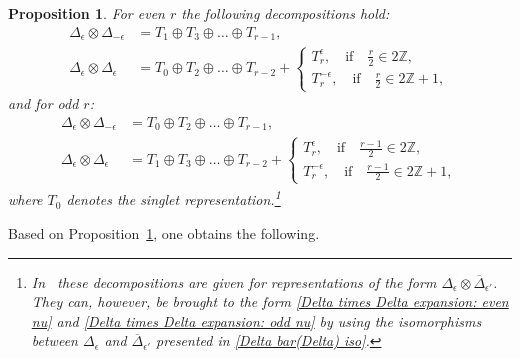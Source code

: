 \documentclass[a4paper]{article}
\newcommand{\oDelta}{\overline{\Delta}}
\renewcommand{\=}{\ =\ }
\numberwithin{equation}{section}
\newtheorem{proposition}{Proposition}
\theoremstyle{remark}
\begin{document}
\begin{proposition}\label{Proposition 6.4.1 from IsRu2}
For even $r$ the following decompositions hold:
\begin{equation}\label{Delta times Delta expansion: even nu}
\begin{aligned}
\Delta_\epsilon\otimes \Delta_{-\epsilon}&=T_1\oplus T_3\oplus\dots\oplus T_{r-1},\\
\Delta_\epsilon\otimes \Delta_{\epsilon}&=T_0\oplus T_2\oplus\dots\oplus T_{r-2}+
\left\{\begin{array}{l}
T_r^\epsilon,\quad\text{if}\quad \frac{r}{2}\in 2\mathbb{Z},\\
T_r^{-\epsilon},\quad\text{if}\quad \frac{r}{2}\in 2\mathbb{Z}+1,
\end{array}\right.
\end{aligned}
\end{equation}
and for odd $r$:
\begin{equation}\label{Delta times Delta expansion: odd nu}
\begin{aligned}
\Delta_\epsilon\otimes \Delta_{-\epsilon}&=T_0\oplus T_2\oplus\dots\oplus T_{r-1},\\
\Delta_\epsilon\otimes \Delta_{\epsilon}&=T_1\oplus T_3\oplus\dots\oplus T_{r-2}+
\left\{\begin{array}{l}
T_r^\epsilon,\quad\text{if}\quad \frac{r-1}{2}\in 2\mathbb{Z},\\
T_r^{-\epsilon},\quad\text{if}\quad \frac{r-1}{2}\in 2\mathbb{Z}+1,
\end{array}\right.
\end{aligned}
\end{equation}
where $T_0$ denotes the singlet representation.\footnote{
In~\cite{IsRu2} these decompositions are given for representations of the form
$\Delta_\epsilon\otimes \oDelta_{\epsilon'}$.
They can, however, be brought to the form
\eqref{Delta times Delta expansion: even nu} and
\eqref{Delta times Delta expansion: odd nu}
by using the isomorphisms between $\Delta_\epsilon$ and $\oDelta_{\epsilon'}$
presented in \eqref{Delta bar(Delta) iso}.
}
\end{proposition}

Based on Proposition~\ref{Proposition 6.4.1 from IsRu2}, one obtains the following.
\end{document}
